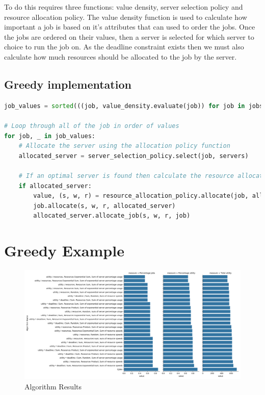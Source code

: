 \documentclass[fleqn]{article}
\begin{document}
To do this requires three functions: value density, server selection policy and resource allocation policy.
The value density function is used to calculate how important a job is based on it's attributes that can used to order the jobs.
Once the jobs are ordered on their values, then a server is selected for which server to choice to run the job on.
As the deadline constraint exists then we must also calculate how much resources should be allocated to the job by the server.

\subsection{Greedy implementation}\label{subsec:greedy-implementation}
\begin{lstlisting}[language=Python]
job_values = sorted(((job, value_density.evaluate(job)) for job in jobs), key=lambda jv: jv[1], reverse=True)

# Loop through all of the job in order of values
for job, _ in job_values:
    # Allocate the server using the allocation policy function
    allocated_server = server_selection_policy.select(job, servers)

    # If an optimal server is found then calculate the resource allocation policy
    if allocated_server:
        value, (s, w, r) = resource_allocation_policy.allocate(job, allocated_server)
        job.allocate(s, w, r, allocated_server)
        allocated_server.allocate_job(s, w, r, job)
\end{lstlisting}

\section{Greedy Example}\label{sec:greedy-example}
\begin{figure}[H]
    \centering
    \includegraphics[width=1\linewidth]{../results/greedy_algorithms.png}
    \caption{Algorithm Results}
\end{figure}
\end{document}
